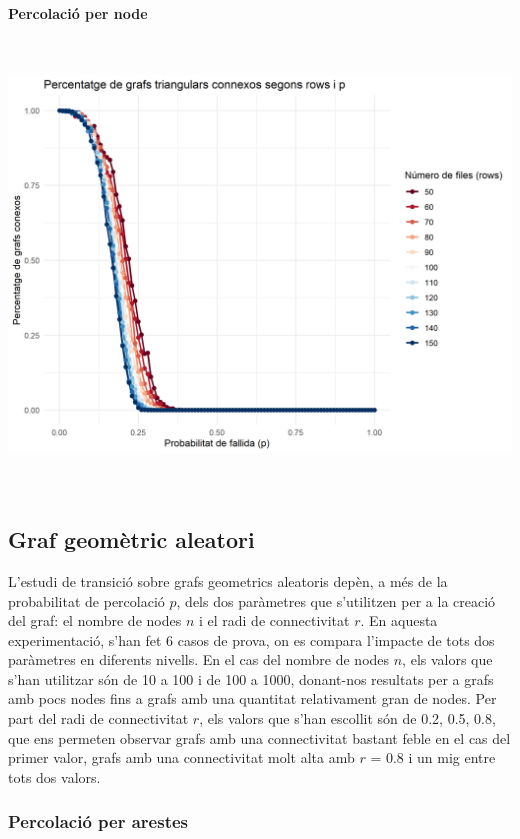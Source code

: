 \documentclass[a4paper]{article}
\begin{document}
	
	\textbf{Percolació per node}
	
	\includegraphics[height=12cm]{images/triangularN-50-150}
	
	
	\subsection{Graf geomètric aleatori}

	L'estudi de transició sobre grafs geometrics aleatoris depèn, a més de la probabilitat de percolació $p$, dels dos paràmetres que s'utilitzen per a la creació del graf: el nombre de nodes $n$ i el radi de connectivitat $r$.
	En aquesta experimentació, s'han fet 6 casos de prova, on es compara l'impacte de tots dos paràmetres en diferents nivells. En el cas del nombre de nodes $n$, els valors que s'han utilitzar són de 10 a 100 i de 100 a 1000,
	donant-nos resultats per a grafs amb pocs nodes fins a grafs amb una quantitat relativament gran de nodes. Per part del radi de connectivitat $r$, els valors que s'han escollit són de 0.2, 0.5, 0.8, que ens permeten observar grafs amb una connectivitat
	bastant feble en el cas del primer valor, grafs amb una connectivitat molt alta amb $r$ = 0.8 i un mig entre tots dos valors.

	\subsubsection{Percolació per arestes}
\end{document}
